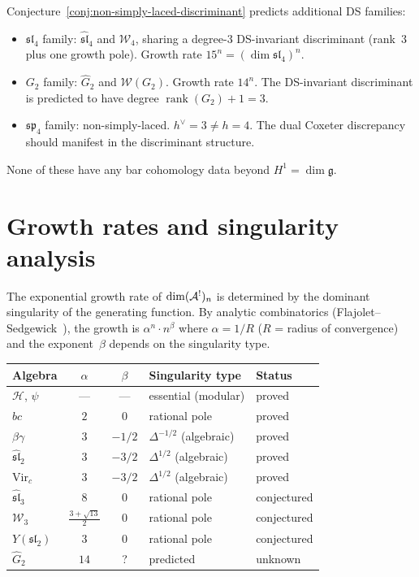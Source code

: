 \begin{remark}
Conjecture~\ref{conj:non-simply-laced-discriminant} predicts additional DS families:
\begin{itemize}
\item $\mathfrak{sl}_4$ family: $\widehat{\mathfrak{sl}}_4$ and $\mathcal{W}_4$, sharing a degree-$3$ DS-invariant discriminant (rank~$3$ plus one growth pole).  Growth rate $15^n = (\dim\mathfrak{sl}_4)^n$.
\item $G_2$ family: $\widehat{G}_2$ and $\mathcal{W}(G_2)$.  Growth rate $14^n$.  The DS-invariant discriminant is predicted to have degree $\operatorname{rank}(G_2) + 1 = 3$.
\item $\mathfrak{sp}_4$ family: non-simply-laced.  $h^\vee = 3 \neq h = 4$.  The dual Coxeter discrepancy should manifest in the discriminant structure.
\end{itemize}
None of these have any bar cohomology data beyond $H^1 = \dim\mathfrak{g}$.
\end{remark}


\section{Growth rates and singularity analysis}
\label{sec:growth-rates}

The exponential growth rate of $\dim(\mathcal{A}^!)_n$ is determined by the dominant singularity of the generating function.  By analytic combinatorics (Flajolet--Sedgewick~\cite{FlajoletSedgewick}), the growth is $\alpha^n \cdot n^{\beta}$ where $\alpha = 1/R$ ($R$ = radius of convergence) and the exponent~$\beta$ depends on the singularity type.

\begin{center}
\renewcommand{\arraystretch}{1.4}
\begin{tabular}{lccll}
\toprule
\textbf{Algebra} & $\alpha$ & $\beta$ & \textbf{Singularity type} & \textbf{Status} \\
\midrule
$\mathcal{H}$, $\psi$ & --- & --- & essential (modular) & proved \\
$bc$ & $2$ & $0$ & rational pole & proved \\
$\beta\gamma$ & $3$ & $-1/2$ & $\Delta^{-1/2}$ (algebraic) & proved \\
$\widehat{\mathfrak{sl}}_2$ & $3$ & $-3/2$ & $\Delta^{1/2}$ (algebraic) & proved \\
$\mathrm{Vir}_c$ & $3$ & $-3/2$ & $\Delta^{1/2}$ (algebraic) & proved \\
$\widehat{\mathfrak{sl}}_3$ & $8$ & $0$ & rational pole & conjectured \\
$\mathcal{W}_3$ & $\frac{3+\sqrt{13}}{2}$ & $0$ & rational pole & conjectured \\
$Y(\mathfrak{sl}_2)$ & $3$ & $0$ & rational pole & conjectured \\
$\widehat{G}_2$ & $14$ & ? & predicted & unknown \\
\bottomrule
\end{tabular}
\end{center}


